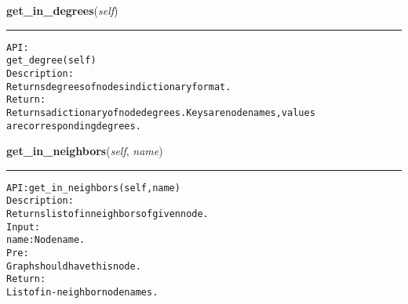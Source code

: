     \vspace{0.5ex}

\hspace{.8\funcindent}\begin{boxedminipage}{\funcwidth}

    \raggedright \textbf{get\_in\_degrees}(\textit{self})

    \vspace{-1.5ex}

    \rule{\textwidth}{0.5\fboxrule}
\setlength{\parskip}{2ex}
\begin{alltt}

API:
    get\_degree(self)
Description:
    Returns degrees of nodes in dictionary format.
Return:
    Returns a dictionary of node degrees. Keys are node names, values
    are corresponding degrees.
\end{alltt}

\setlength{\parskip}{1ex}
    \end{boxedminipage}

    \label{coinor:gimpy:graph:Graph:get_in_neighbors}

    \vspace{0.5ex}

\hspace{.8\funcindent}\begin{boxedminipage}{\funcwidth}

    \raggedright \textbf{get\_in\_neighbors}(\textit{self}, \textit{name})

    \vspace{-1.5ex}

    \rule{\textwidth}{0.5\fboxrule}
\setlength{\parskip}{2ex}
\begin{alltt}

API: get\_in\_neighbors(self, name)
Description:
Returns list of in neighbors of given node.
Input:
    name: Node name.
Pre:
    Graph should have this node.
Return:
    List of in-neighbor node names.
\end{alltt}

\setlength{\parskip}{1ex}
    \end{boxedminipage}

    \label{coinor:gimpy:graph:Graph:get_layout}

